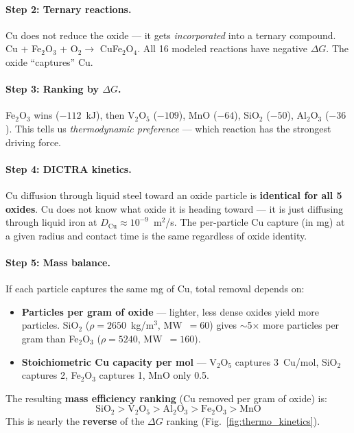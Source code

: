 \documentclass[11pt]{article}
\begin{document}
\paragraph{Step 2: Ternary reactions.} Cu does not reduce the oxide --- it gets \textit{incorporated} into a ternary compound. Cu + Fe$_2$O$_3$ + O$_2 \to$ CuFe$_2$O$_4$. All 16 modeled reactions have negative $\Delta G$. The oxide ``captures'' Cu.

\paragraph{Step 3: Ranking by $\Delta G$.} Fe$_2$O$_3$ wins ($-112$~kJ), then V$_2$O$_5$ ($-109$), MnO ($-64$), SiO$_2$ ($-50$), Al$_2$O$_3$ ($-36$). This tells us \textit{thermodynamic preference} --- which reaction has the strongest driving force.

\paragraph{Step 4: DICTRA kinetics.} Cu diffusion through liquid steel toward an oxide particle is \textbf{identical for all 5 oxides}. Cu does not know what oxide it is heading toward --- it is just diffusing through liquid iron at $D_{\text{Cu}} \approx 10^{-9}$~m$^2$/s. The per-particle Cu capture (in mg) at a given radius and contact time is the same regardless of oxide identity.

\paragraph{Step 5: Mass balance.} If each particle captures the same mg of Cu, total removal depends on:
\begin{itemize}[leftmargin=*]
    \item \textbf{Particles per gram of oxide} --- lighter, less dense oxides yield more particles. SiO$_2$ ($\rho = 2650$~kg/m$^3$, MW~$= 60$) gives $\sim$5$\times$ more particles per gram than Fe$_2$O$_3$ ($\rho = 5240$, MW~$= 160$).
    \item \textbf{Stoichiometric Cu capacity per mol} --- V$_2$O$_5$ captures 3~Cu/mol, SiO$_2$ captures 2, Fe$_2$O$_3$ captures 1, MnO only 0.5.
\end{itemize}

The resulting \textbf{mass efficiency ranking} (Cu removed per gram of oxide) is:
\[
\text{SiO}_2 > \text{V}_2\text{O}_5 > \text{Al}_2\text{O}_3 > \text{Fe}_2\text{O}_3 > \text{MnO}
\]
This is nearly the \textbf{reverse} of the $\Delta G$ ranking (Fig.~\ref{fig:thermo_kinetics}).
\end{document}
